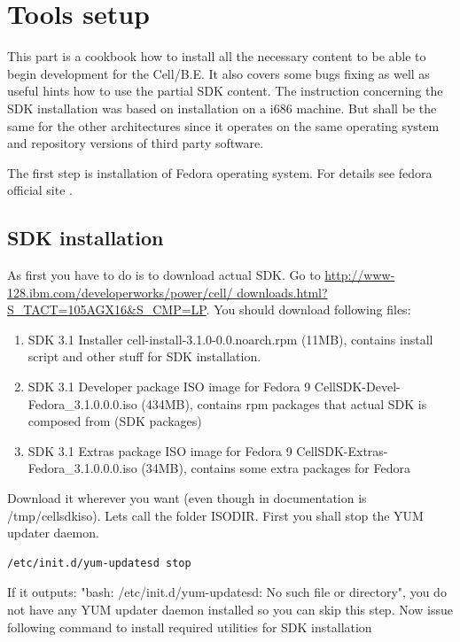 \chapter{Tools setup}
\label{toolsSetup}

\par
This part is a cookbook how to install all the necessary content to be able to begin development for the \mbox{Cell/B.E.}
It also covers some bugs fixing as well as useful hints how to use the partial SDK content.
The instruction concerning the SDK installation was based on installation on a i686 machine.
But shall be the same for the other architectures since it operates on the same operating system and repository versions of third party software.

\par
The first step is installation of Fedora operating system.
For details see fedora official site \cite{fedorasite}.

\section{SDK installation}

As first you have to do is to download actual SDK.
Go to \url{http://www-128.ibm.com/developerworks/power/cell/ downloads.html?S_TACT=105AGX16&S_CMP=LP}.
You should download following files:

\begin{enumerate}
\item SDK 3.1 Installer
cell-install-3.1.0-0.0.noarch.rpm  (11MB), contains install script and other stuff for SDK installation.
\item SDK 3.1 Developer package ISO image for Fedora 9
CellSDK-Devel-Fedora\_3.1.0.0.0.iso  (434MB), contains rpm packages that actual SDK is composed from (SDK packages)
\item SDK 3.1 Extras package ISO image for Fedora 9
CellSDK-Extras-Fedora\_3.1.0.0.0.iso  (34MB), contains some extra packages for Fedora
\end{enumerate}

Download it wherever you want (even though in documentation is /tmp/cellsdkiso).
Lets call the folder ISODIR.
First you shall stop the YUM updater daemon.

\begin{verbatim}
/etc/init.d/yum-updatesd stop
\end{verbatim}

If it outputs: "bash: /etc/init.d/yum-updatesd: No such file or directory", you do not have any YUM updater daemon installed so you can skip this step.
Now issue following command to install required utilities for SDK installation

